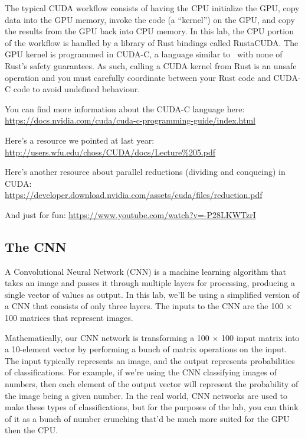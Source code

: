 The typical CUDA workflow consists of having the CPU initialize the GPU, copy data into the GPU memory, invoke the code (a ``kernel'') on the GPU, and copy the results from the GPU back into CPU memory. In this lab, the CPU portion of the workflow is handled by a library of Rust bindings called RustaCUDA. The GPU kernel is programmed in CUDA-C, a language similar to \CPP~with none of Rust's safety guarantees. As such, calling a CUDA kernel from Rust is an unsafe operation and you must carefully coordinate between your Rust code and CUDA-C code to avoid undefined behaviour.

You can find more information about the CUDA-C language here:\\ \url{https://docs.nvidia.com/cuda/cuda-c-programming-guide/index.html}

Here's a resource we pointed at last year:\\
\url{http://users.wfu.edu/choss/CUDA/docs/Lecture%205.pdf}

Here's another resource about parallel reductions (dividing and conqueing) in CUDA:\\
\url{https://developer.download.nvidia.com/assets/cuda/files/reduction.pdf}

And just for fun: \url{https://www.youtube.com/watch?v=-P28LKWTzrI}

\subsection*{The CNN}

A Convolutional Neural Network (CNN) is a machine learning algorithm that takes an image and passes it through multiple layers for processing, producing a single vector of values as output. In this lab, we'll be using a simplified version of a CNN that consists of only three layers. The inputs to the CNN are the 100 $\times$ 100 matrices that represent images.

Mathematically, our CNN network is transforming a 100 $\times$ 100 input matrix into a 10-element vector by performing a bunch of matrix operations on the input. The input typically represents an image, and the output represents probabilities of classifications. For example, if we're using the CNN classifying images of numbers, then each element of the output vector will represent the probability of the image being a given number. In the real world, CNN networks are used to make these types of classifications, but for the purposes of the lab, you can think of it as a bunch of number crunching that'd be much more suited for the GPU then the CPU.

